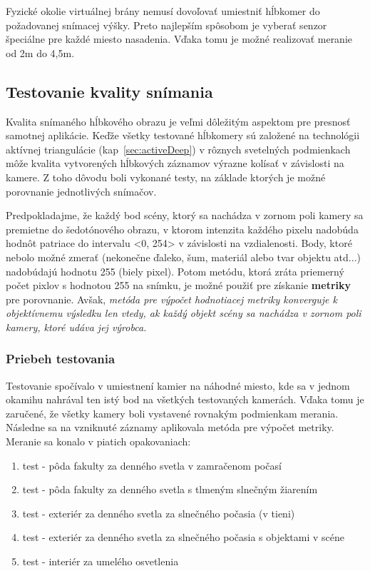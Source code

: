 Fyzické okolie virtuálnej brány nemusí dovoľovať umiestniť hĺbkomer do požadovanej snímacej výšky. Preto najlepším spôsobom je vyberať senzor špeciálne pre každé miesto nasadenia. Vďaka tomu je možné realizovať meranie od 2m do 4,5m.



\subsection{Testovanie kvality snímania}
Kvalita snímaného hĺbkového obrazu je veľmi dôležitým aspektom pre presnosť samotnej aplikácie. Keďže všetky testované hĺbkomery sú založené na technológii aktívnej triangulácie (kap~\ref{sec:activeDeep}) v rôznych svetelných podmienkach môže kvalita vytvorených hĺbkových záznamov výrazne kolísať v závislosti na kamere. Z toho dôvodu boli vykonané testy, na základe ktorých je možné porovnanie jednotlivých snímačov. 

Predpokladajme, že každý bod scény, ktorý sa nachádza v zornom poli kamery sa premietne do šedotónového obrazu, v ktorom intenzita každého pixelu nadobúda hodnôt patriace do intervalu <0, 254> v závislosti na vzdialenosti. Body, ktoré nebolo možné zmerať (nekonečne ďaleko, šum, materiál alebo tvar objektu atd...) nadobúdajú hodnotu 255 (biely pixel). Potom metódu, ktorá zráta priemerný počet pixlov s hodnotou 255 na snímku, je možné použiť pre získanie \textbf{metriky} pre porovnanie. Avšak, \textit{metóda pre výpočet hodnotiacej metriky konverguje k objektívnemu výsledku len vtedy, ak každý objekt scény sa nachádza v zornom poli kamery, ktoré udáva jej výrobca.}       

\subsubsection{Priebeh testovania}
Testovanie spočívalo v umiestnení kamier na náhodné miesto, kde sa v jednom okamihu nahrával ten istý bod na všetkých testovaných kamerách. Vďaka tomu je zaručené, že všetky kamery boli vystavené rovnakým podmienkam merania. Následne sa na vzniknuté záznamy aplikovala metóda pre výpočet metriky. Meranie sa konalo v piatich opakovaniach: 

\begin{enumerate}
\item test - pôda fakulty za denného svetla v zamračenom počasí
\item test - pôda fakulty za denného svetla s tlmeným slnečným žiarením
\item test - exteriér za denného svetla za slnečného počasia (v tieni)
\item test - exteriér za denného svetla za slnečného počasia s objektami v scéne
\item test - interiér za umelého osvetlenia
\end{enumerate}


